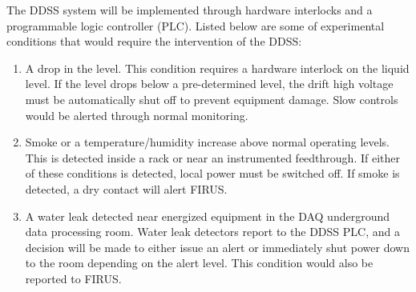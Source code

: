 The DDSS system will be implemented through hardware interlocks and a programmable logic controller
(PLC).  Listed below are some of  experimental conditions that would
require the intervention of the DDSS:
\begin{enumerate}
 \item A drop in the  level.  This condition requires a hardware
   interlock on the liquid level.  If the level drops below a
   pre-determined level, the drift high voltage must be automatically 
   shut off to prevent equipment damage.  Slow controls would be
   alerted through normal monitoring.
 \item Smoke or a temperature/humidity increase above normal operating
   levels. This is detected inside a rack or near an instrumented
   feedthrough.  If either of these conditions is detected, local
   power must be switched off. If smoke is detected, a
   dry contact will alert FIRUS.
 \item A water leak detected near energized equipment in the DAQ
   underground data processing room.  Water leak detectors 
   report to the DDSS PLC, and a decision will be made to either
   issue an alert or immediately shut power down to the room depending
   on the alert level.  This condition would also be reported
   to FIRUS.
\end{enumerate}
  

